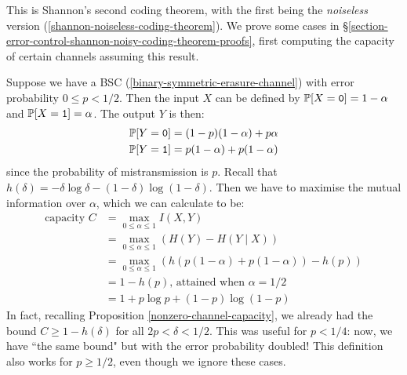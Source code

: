 \documentclass{article}
\begin{document}
\begin{note}
	This is Shannon's second coding theorem,
	with the first being the \textit{noiseless} version
	(\ref{shannon-noiseless-coding-theorem}).
	We prove some cases in \S\ref{section-error-control-shannon-noisy-coding-theorem-proofs},
	first computing the capacity of certain channels assuming this result.
\end{note}

\begin{example}
    Suppose we have a BSC (\ref{binary-symmetric-erasure-channel})
    with error probability $0 \leq p < 1/2$.
    Then the input $X$ can be defined by
    $\P[X = \texttt{0}] = 1-\alpha$ and $\P[X=\texttt{1}] = \alpha$.
    The output $Y$ is then:
    \begin{align*}
    	\P[Y = \texttt{0}] &= (1-p)(1-\alpha) + p\alpha \\
    	\P[Y = \texttt{1}] &= p(1-\alpha) + p(1-\alpha)
	\end{align*}
	since the probability of mistransmission is $p$.
	Recall that $h(\delta) = -\delta \log \delta - (1-\delta) \log(1-\delta)$.
	Then we have to maximise the mutual information over $\alpha$,
	which we can calculate to be:
	\begin{align*}
    	\text{capacity } C &= \max_{0 \leq \alpha \leq 1} I(X, Y) \\
    	&= \max_{0 \leq \alpha \leq 1} (H(Y) - H(Y \mid X)) \\
    	&= \max_{0 \leq \alpha \leq 1} (h(p(1-\alpha) + p(1-\alpha)) - h(p)) \\
    	&= 1 - h(p) \text{, attained when $\alpha = 1/2$}\\
    	&= 1 + p \log p + (1-p) \log(1-p)
	\end{align*}
	In fact, recalling Proposition \ref{nonzero-channel-capacity},
	we already had the bound $C \geq 1 - h(\delta)$ for all $2p < \delta < 1/2$.
	This was useful for $p < 1/4$: now, we have ``the same bound"
	but with the error probability doubled!
	This definition also works for $p \geq 1/2$,
	even though we ignore these cases.
\end{example}
\end{document}
